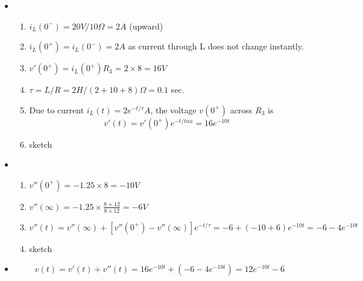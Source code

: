 \documentclass{article}
\begin{document}
\begin{itemize}
\begin{itemize}
  \item
    \begin{enumerate}
    \item $i_L(0^-)=20V/10\Omega=2A$ (upward)
    \item $i_L(0^+)=i_L(0^-)=2A$ as current through L does not change instantly.
    \item $v'(0^+)=i_L(0^+)R_3=2\times 8=16 V$
    \item $\tau=L/R=2H/(2+10+8)\Omega=0.1$ sec.
    \item Due to current $i_L(t)=2 e^{-t/\tau}A$, the voltage $v(0^+)$ across $R_3$
      is
      \[ v'(t)=v'(0^+) e^{-t/tau}=16 e^{-10t} \]
      \item sketch
    \end{enumerate}
  \item
    \begin{enumerate}
    \item $v''(0^+)=-1.25\times 8=-10 V$
    \item $v''(\infty)=-1.25\times\frac{8+12}{8\times 12}=-6 V$
    \item \[ v''(t)=v''(\infty)+[v''(0^+)-v''(\infty)]e^{-t/\tau}=
      -6+(-10+6)e^{-10t}=-6-4e^{-10t} \]
    \item sketch
    \end{enumerate}
  \item \[ v(t)=v'(t)+v''(t)=16 e^{-10t}+(-6-4e^{-10t})=12e^{-10t}-6 \]
\end{itemize}
\end{itemize}
\end{document}
